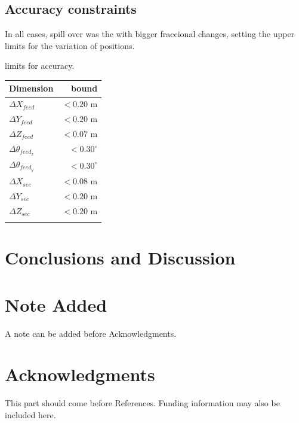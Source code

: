 \documentclass{ws-jai}
\begin{document}
\subsection{Accuracy constraints}

In all cases, spill over was the with bigger fraccional changes, setting the upper limits for the variation of positions.

\begin{wstable}[h]
\caption{limits for accuracy.}
\begin{tabular}{lr}
\toprule
Dimension & bound \\
\toprule
$\Delta X_{feed}$  & \hphantom{0}$< 0.20$ m \\
$\Delta Y_{feed}$  & \hphantom{0} $< 0.20$ m \\
$\Delta Z_{feed}$  & \hphantom{0} $< 0.07$ m \\
$\Delta \theta_{feed_x}$  & \hphantom{0}$< 0.30^\circ$  \\
$\Delta \theta_{feed_y}$  & \hphantom{0}$< 0.30^\circ$  \\
$\Delta X_{sec}$  & \hphantom{0} $< 0.08$ m \\
$\Delta Y_{sec}$  & \hphantom{0} $< 0.20$ m \\
$\Delta Z_{sec}$  & \hphantom{0} $< 0.20$ m \\ \botrule
\end{tabular}
\label{aba:tbl1}
\end{wstable}


\section{Conclusions and Discussion}



\section*{Note Added}
A note can be added before Acknowledgments.

\section*{Acknowledgments}
This part should come before References. Funding information may also be included here.





\end{document}
